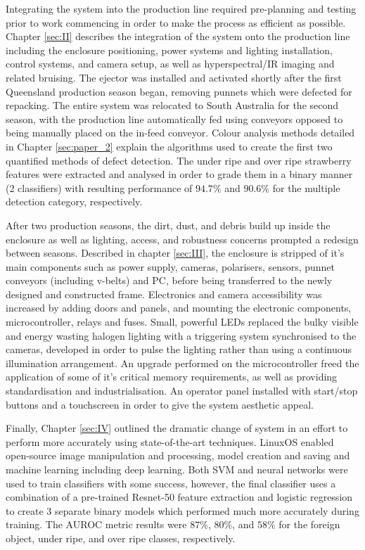 \documentclass[fleqn,twoside,12pt]{report}
\begin{document}
Integrating the system into the production line required pre-planning and testing prior to work commencing in order to make the process as efficient as possible. Chapter \ref{sec:II} describes the integration of the system onto the production line including the enclosure positioning, power systems and lighting installation, control systems, and camera setup, as well as hyperspectral/IR imaging and related bruising. The ejector was installed and activated shortly after the first Queensland production season began, removing punnets which were defected for repacking. The entire system was relocated to South Australia for the second season, with the production line automatically fed using conveyors opposed to being manually placed on the in-feed conveyor. Colour analysis methods detailed in Chapter \ref{sec:paper_2} explain the algorithms used to create the first two quantified methods of defect detection. The under ripe and over ripe strawberry features were extracted and analysed in order to grade them in a binary manner (2 classifiers) with resulting performance of $94.7\%$ and $90.6\%$ for the multiple detection category, respectively.

After two production seasons, the dirt, dust, and debris build up inside the enclosure as well as lighting, access, and robustness concerns prompted a redesign between seasons. Described in chapter \ref{sec:III}, the enclosure is stripped of it's main components such as power supply, cameras, polarisers, sensors, punnet conveyors (including v-belts) and PC, before being transferred to the newly designed and constructed frame. Electronics and camera accessibility was increased by adding doors and panels, and mounting the electronic components, microcontroller, relays and fuses. Small, powerful LEDs replaced the bulky visible and energy wasting halogen lighting with a triggering system synchronised to the cameras, developed in order to pulse the lighting rather than using a continuous illumination arrangement. An upgrade performed on the microcontroller freed the application of some of it's critical memory requirements, as well as providing standardisation and industrialisation. An operator panel installed with start/stop buttons and a touchscreen in order to give the system aesthetic appeal. 

Finally, Chapter \ref{sec:IV} outlined the dramatic change of system in an effort to perform more accurately using state-of-the-art techniques. Linux\textregistered OS enabled open-source image manipulation and processing, model creation and saving and machine learning including deep learning. Both SVM and neural networks were used to train classifiers with some success, however, the final classifier uses a combination of a pre-trained Resnet-50 feature extraction and logistic regression to create 3 separate binary models which performed much more accurately during training. The AUROC metric results were $87\%$, $80\%$, and $58\%$ for the foreign object, under ripe, and over ripe classes, respectively. 
\end{document}

